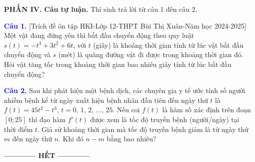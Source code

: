 \documentclass[12pt,a4paper]{article}
\begin{document}
\noindent\textbf{PHẦN IV. Câu tự luận.}
Thí sinh trả lời từ câu 1 đến câu 2.

\medskip

\noindent\textcolor{blue}{\textbf{Câu 1.}} [Trích đề ôn tập HKI-Lớp 12-THPT Bùi Thị Xuân-Năm học 2024-2025]
	Một vật đang đứng yên thì bắt đầu chuyển động theo quy luật $s(t)=-t^3+3t^2+6t$, với $t$ (giây) là khoảng thời gian tính từ lúc vật bắt đầu chuyển động và $s$ (mét) là quãng đường vật đi được trong khoảng thời gian đó. Hỏi vật tăng tốc trong khoảng thời gian bao nhiêu giây tính từ lúc bắt đầu chuyển động?

\noindent\textcolor{blue}{\textbf{Câu 2.}} Sau khi phát hiện một bệnh dịch, các chuyên gia y tế ước tính số người nhiễm bệnh kể từ ngày xuất hiện bệnh nhân đầu tiên đến ngày thứ $t$ là $f(t)=45t^2-t^3$, $t=0$, $1$, $2$, $\ldots$, $25$. Nếu coi $f(t)$ là hàm số xác định trên đoạn $[0; 25]$ thì đạo hàm $f'(t)$ được xem là tốc độ truyền bệnh (người/ngày) tại thời điểm $t$. Giả sử khoảng thời gian mà tốc độ truyền bệnh giảm là từ ngày thứ $m$ đến ngày thứ $n$. Khi đó $n-m$ bằng bao nhiêu?


\textbf{------------ HẾT ------------}
\label{lastpage}
\end{document}
